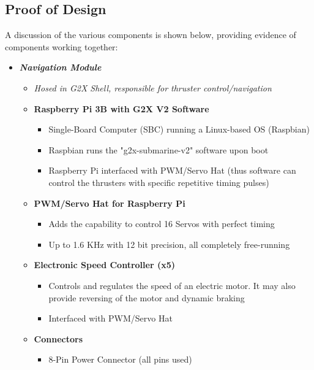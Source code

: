 \documentclass[12pt]{article}
\begin{document}
{		\clearpage
		
		
		\subsection{Proof of Design}
		A discussion of the various components is shown below, providing evidence of components working together:\\
		
		{\renewcommand\labelitemi{}
			\begin{itemize}
				\item \textbf{\textit{Navigation Module}}
					\begin{itemize}
						\item[] \textit{Hosed in G2X Shell, responsible for thruster control/navigation\\}
						\item[] \textbf{Raspberry Pi 3B with G2X V2 Software}
						\begin{itemize}
							\item Single-Board Computer (SBC) running a Linux-based OS (Raspbian)
							\item Raspbian runs the "g2x-submarine-v2" software upon boot
							\item Raspberry Pi interfaced with PWM/Servo Hat (thus software can control the thrusters with specific repetitive timing pulses)
						\end{itemize}
						\item[] \textbf{PWM/Servo Hat for Raspberry Pi}
						\begin{itemize}
							\item Adds the capability to control 16 Servos with perfect timing
							\item Up to 1.6 KHz with 12 bit precision, all completely free-running
						\end{itemize}
						\item[] \textbf{Electronic Speed Controller (x5)}
						\begin{itemize}
							\item Controls and regulates the speed of an electric motor. It may also provide reversing of the motor and dynamic braking
							\item Interfaced with PWM/Servo Hat
						\end{itemize}
						\item[] \textbf{Connectors}
						\begin{itemize}
							\item 8-Pin Power Connector (all pins used)

\end{itemize}
\end{itemize}
\end{itemize}}}
\end{document}
